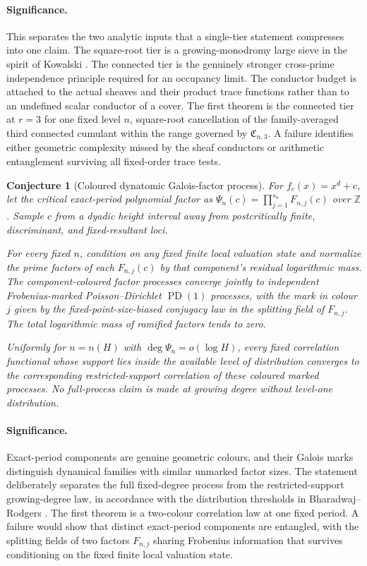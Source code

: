 \documentclass[11pt]{article}
\newtheorem{conjecture}{Conjecture}
\theoremstyle{definition}
\newcommand{\PD}{\operatorname{PD}}
\newcommand{\Z}{\mathbb Z}
\providecommand{\Z}{\mathbb Z}
\begin{document}
\paragraph{Significance.}
This separates the two analytic inputs that a single-tier statement compresses into one
claim.  The square-root tier is a growing-monodromy large sieve in the spirit of
Kowalski \cite{KowalskiSieve}.  The connected tier is the genuinely stronger
cross-prime independence principle required for an occupancy limit.  The conductor
budget is attached to the actual sheaves and their product trace functions rather than to an undefined scalar conductor of a cover. The first theorem is the connected tier at $r=3$ for one fixed level $n$, square-root cancellation of the family-averaged third connected cumulant within the range governed by $\mathfrak C_{n,3}$.  A failure identifies either geometric
complexity missed by the sheaf conductors or arithmetic entanglement surviving all
fixed-order trace tests.

\begin{conjecture}[Coloured dynatomic Galois-factor process]\label{s18}
For $f_c(x)=x^d+c$, let the critical exact-period polynomial factor as
$\Psi_n(c)=\prod_{j=1}^{s_n}F_{n,j}(c)$ over $\Z$.  Sample $c$ from a dyadic height
interval away from postcritically finite, discriminant, and fixed-resultant loci.

For every fixed $n$, condition on any fixed finite local valuation state and normalize
the prime factors of each $F_{n,j}(c)$ by that component's residual logarithmic mass.
The component-coloured factor processes converge jointly to independent
Frobenius-marked Poisson--Dirichlet $\PD(1)$ processes, with the mark in colour $j$ given by the
fixed-point-size-biased conjugacy law in the splitting field of $F_{n,j}$.  The total
logarithmic mass of ramified factors tends to zero.

Uniformly for $n=n(H)$ with $\deg\Psi_n=o(\log H)$, every fixed correlation functional
whose support lies inside the available level of distribution converges to the
corresponding restricted-support correlation of these coloured marked processes.  No
full-process claim is made at growing degree without level-one distribution.
\end{conjecture}

\paragraph{Significance.}
Exact-period components are genuine geometric colours, and their Galois marks distinguish
dynamical families with similar unmarked factor sizes.  The statement deliberately
separates the full fixed-degree process from the restricted-support growing-degree law,
in accordance with the distribution thresholds in Bharadwaj--Rodgers \cite{BR}.  The first theorem is a two-colour correlation law at one fixed period. A failure would show that distinct exact-period components are entangled, with the splitting fields of two factors $F_{n,j}$ sharing Frobenius information that survives conditioning on the fixed finite local valuation state.
\end{document}
